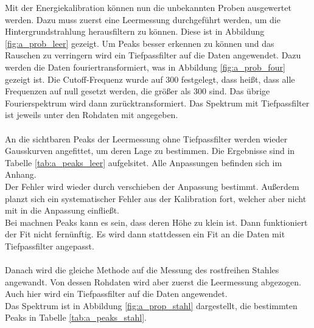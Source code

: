 \documentclass[12pt,a4paper]{article}
\begin{document}
Mit der Energiekalibration können nun die unbekannten Proben ausgewertet werden. Dazu muss zuerst eine Leermessung durchgeführt werden, um die Hintergrundstrahlung herausfiltern zu können. Diese ist in Abbildung \ref{fig:a_prob_leer} gezeigt. Um Peaks besser erkennen zu können und das Rauschen zu verringern wird ein Tiefpassfilter auf die Daten angewendet. Dazu werden die Daten fouriertransformiert, was in Abbildung \ref{fig:a_prob_four} gezeigt ist. Die Cutoff-Frequenz wurde auf 300 festgelegt, dass heißt, dass alle Frequenzen auf null gesetzt werden, die größer als 300 sind. Das übrige Fourierspektrum wird dann zurücktransformiert. Das Spektrum mit Tiefpassfilter ist jeweils unter den Rohdaten mit angegeben.\\
\\
An die sichtbaren Peaks der Leermessung ohne Tiefpassfilter werden wieder Gausskurven angefittet, um deren Lage zu bestimmen. Die Ergebnisse sind in Tabelle \ref{tab:a_peaks_leer} aufgelsitet. Alle Anpassungen befinden sich im Anhang.\\
Der Fehler wird wieder durch verschieben der Anpassung bestimmt. Außerdem planzt sich ein systematischer Fehler aus der Kalibration fort, welcher aber nicht mit in die Anpassung einfließt.\\
Bei machnen Peaks kann es sein, dass deren Höhe zu klein ist. Dann funktioniert der Fit nicht fernünftig. Es wird dann stattdessen ein Fit an die Daten mit Tiefpassfilter angepasst.\\
\\
Danach wird die gleiche Methode auf die Messung des rostfreihen Stahles angewandt. 
Von dessen Rohdaten wird aber zuerst die Leermessung abgezogen. 
Auch hier wird ein Tiefpassfilter auf die Daten angewendet.\\
Das Spektrum ist in Abbildung \ref{fig:a_prop_stahl} dargestellt, die bestimmten Peaks in Tabelle \ref{tab:a_peaks_stahl}.
\end{document}
